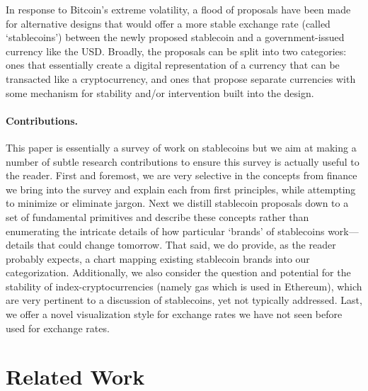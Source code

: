 In response to Bitcoin's extreme volatility, a flood of proposals have been made for alternative designs that would offer a more stable exchange rate (called `stablecoins') between the newly proposed stablecoin and a government-issued currency like the USD. Broadly, the proposals can be split into two categories: ones that essentially create a digital representation of a currency that can be transacted like a cryptocurrency, and ones that propose separate currencies with some mechanism for stability and/or intervention built into the design.

\paragraph{Contributions.} This paper is essentially a survey of work on stablecoins but we aim at making a number of subtle research contributions to ensure this survey is actually useful to the reader. First and foremost, we are very selective in the concepts from finance we bring into the survey and explain each from first principles, while attempting to minimize or eliminate jargon. Next we distill stablecoin proposals down to a set of fundamental primitives and describe these concepts rather than enumerating the intricate details of how particular `brands' of stablecoins work---details that could change tomorrow. That said, we do provide, as the reader probably expects, a chart mapping existing stablecoin brands into our categorization. Additionally, we also consider the question and potential for the stability of index-cryptocurrencies (namely gas which is used in Ethereum), which are very pertinent to a discussion of stablecoins, yet not typically addressed. Last, we offer a novel visualization style for exchange rates we have not seen before used for exchange rates.



\section{Related Work}
\label{sec:lit}

